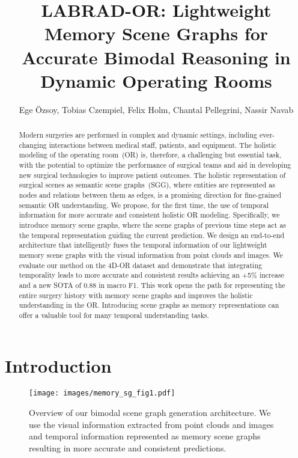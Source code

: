 \documentclass[runningheads]{llncs}
\begin{document}
\newcommand\ang{70}
\newcommand\angtwo{30}
\title{LABRAD-OR: Lightweight Memory Scene Graphs for Accurate Bimodal Reasoning in Dynamic Operating Rooms}


\author{Ege Özsoy, Tobias Czempiel, Felix Holm, Chantal Pellegrini, Nassir Navab}


\maketitle              \begin{abstract}
Modern surgeries are performed in complex and dynamic settings, including ever-changing interactions between medical staff, patients, and equipment. The holistic modeling of the operating room~(OR) is, therefore, a challenging but essential task, with the potential to optimize the performance of surgical teams and aid in developing new surgical technologies to improve patient outcomes. The holistic representation of surgical scenes as semantic scene graphs~(SGG), where entities are represented as nodes and relations between them as edges, is a promising direction for fine-grained semantic OR understanding. We propose, for the first time, the use of temporal information for more accurate and consistent holistic OR modeling. Specifically, we introduce memory scene graphs, where the scene graphs of previous time steps act as the temporal representation guiding the current prediction. We design an end-to-end architecture that intelligently fuses the temporal information of our lightweight memory scene graphs with the visual information from point clouds and images. We evaluate our method on the 4D-OR dataset and demonstrate that integrating temporality leads to more accurate and consistent results achieving an +5\% increase and a new SOTA of 0.88 in macro F1. This work opens the path for representing the entire surgery history with memory scene graphs and improves the holistic understanding in the OR. Introducing scene graphs as memory representations can offer a valuable tool for many temporal understanding tasks.


\end{abstract}

\section{Introduction}
\begin{figure}[hbt!]
	\centering
	\texttt{[image: images/memory\_sg\_fig1.pdf]}
	\caption{Overview of our bimodal scene graph generation architecture. We use the visual information extracted from point clouds and images and temporal information represented as memory scene graphs resulting in more accurate and consistent predictions.}
	\label{fig:method_overview}
\end{figure}
\end{document}
